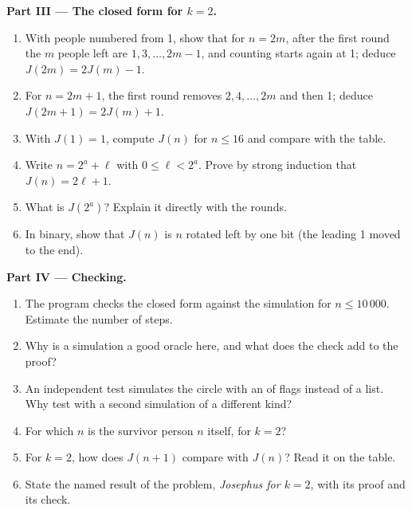 \begin{problem}
\medskip\noindent\textbf{Part III --- The closed form for $k = 2$.}
\begin{enumerate}[resume]
\item With people numbered from 1, show that for $n = 2m$, after the first round the $m$ people left are $1, 3, \dots,
2m - 1$, and counting starts again at 1; deduce $J(2m) = 2J(m) - 1$.
\item For $n = 2m + 1$, the first round removes $2, 4, \dots, 2m$ and then 1; deduce $J(2m + 1) = 2J(m) + 1$.
\item With $J(1) = 1$, compute $J(n)$ for $n \leq 16$ and compare with the table.
\item Write $n = 2^a + \ell$ with $0 \leq \ell < 2^a$. Prove by strong induction that $J(n) = 2\ell + 1$.
\item What is $J(2^a)$? Explain it directly with the rounds.
\item In binary, show that $J(n)$ is $n$ rotated left by one bit (the leading 1 moved to the end).
\end{enumerate}

\medskip\noindent\textbf{Part IV --- Checking.}
\begin{enumerate}[resume]
\item The program checks the closed form against the simulation for $n \leq 10\,000$. Estimate the number of steps.
\item Why is a simulation a good oracle here, and what does the check add to the proof?
\item An independent test simulates the circle with an  of flags instead of a list. Why test with a second
simulation of a different kind?
\item For which $n$ is the survivor person $n$ itself, for $k = 2$?
\item For $k = 2$, how does $J(n + 1)$ compare with $J(n)$? Read it on the table.
\item State the named result of the problem, \emph{Josephus for $k = 2$}, with its proof and its check.
\end{enumerate}
\end{problem}
